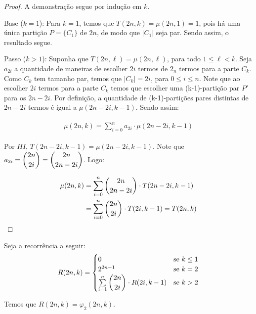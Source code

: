 \documentclass[12pt]{article}
\begin{document}
 \begin{proof}
 	A demonstração segue por indução em $k$. \newl
 	
 	Base ($k = 1$): Para $k = 1$, temos que $T(2n, k) = \mu(2n, 1) = 1$, pois há uma única partição $P=\{C_1\}$ de $2n$, de modo que $|C_1|$ seja par. Sendo assim, o resultado segue. \newl
 	
 	Passo ($k > 1$): Suponha que $T(2n, \ell) = \mu(2n, \ell)$, para todo $1 \leq \ell < k$. Seja $a_{2i}$ a quantidade de maneiras de escolher $2i$ termos de $2_n$ termos para a parte $C_k$. Como $C_k$ tem tamanho par, temos que $|C_k| = 2i$, para $0 \leq i \leq n$. Note que ao escolher $2i$ termos para a parte $C_k$ temos que escolher uma (k-1)-partição par $P'$ para os $2n - 2i$. Por definição, a quantidade de (k-1)-partições pares distintas de $2n - 2i$ termos é igual a $\mu(2n - 2i, k-1)$. Sendo assim: 
 	
 	\begin{align}
 		\begin{split}
 			\mu(2n, k) = \sum\limits_{i = 0}^{n}a_{2i} \cdot \mu(2n - 2i, k-1)
 		\end{split} 
 	\end{align} 
 	
 	Por $HI$, $T(2n - 2i, k-1) = \mu(2n - 2i, k-1)$. Note que $a_{2i} = \escolhe{2n}{2i} = \escolhe{2n}{2n - 2i} $. Logo:
 	
 	\begin{align}
 		\begin{split}
 			\mu(2n, k) &= \sum\limits_{i = 0}^{n}\escolhe{2n}{2n - 2i} \cdot T(2n - 2i, k-1)\\
 			&= \sum\limits_{i = 0}^{n}\escolhe{2n}{2i} \cdot T(2i, k-1) = T(2n, k)
 		\end{split} 
 	\end{align}
 	
 \end{proof} \newl
 
 
  \begin{lema}  
 	\label{lema3}
 	Seja a recorrência a seguir: \\
 	
 	\begin{equation}
 		R(2n, k) =
 		\begin{cases}
 			0 & \text{se $k \leq 1$}\\
 			2^{2n - 1} & \text{se $k = 2$} \\
 			\sum\limits_{i = 1}^{n} \escolhe{2n}{2i} \cdot R(2i, k-1) & \text{se $k > 2$} \\ 
 		\end{cases}
 	\end{equation}
 	
 	Temos que $R(2n, k) = \varphi_2(2n, k)$.
 \end{lema}
  
\end{document}
